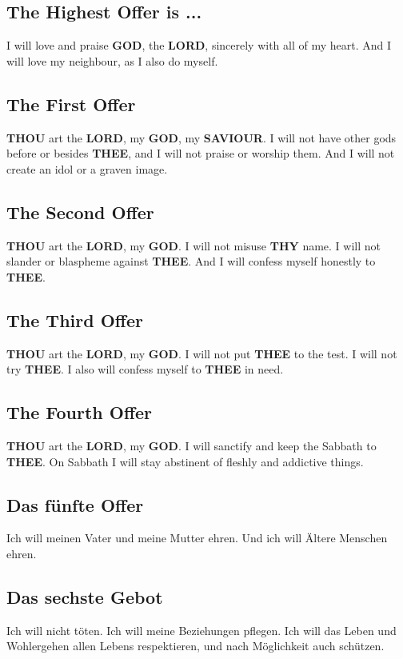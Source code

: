 \documentclass[12pt,a4paper]{article}
\newcommand{\God}[0]{\textbf{GOD}}
\newcommand{\Lord}[0]{\textbf{LORD}}
\newcommand{\Saviour}[0]{\textbf{SAVIOUR}}
\newcommand{\Thee}[0]{\textbf{THEE}}
\newcommand{\Thou}[0]{\textbf{THOU}}
\newcommand{\Thy}[0]{\textbf{THY}}
\begin{document}
	\subsection{The Highest Offer is ...}
		I will love and praise {\God},
		the {\Lord},
		sincerely with all of my heart.
		And I will love my neighbour,
		as I also do myself.
		
	\subsection{The First Offer}
		{\Thou} art the {\Lord},
		my {\God},
		my {\Saviour}.
		I will not have other gods before or besides {\Thee},
		and I will not praise or worship them.
		And I will not create an idol or a graven image.
		
	\subsection{The Second Offer}
		{\Thou} art the {\Lord},
		my {\God}.
		I will not misuse {\Thy} name.
		I will not slander or blaspheme against {\Thee}.
		And I will confess myself honestly to {\Thee}.
			
	\subsection{The Third Offer}
		{\Thou} art the {\Lord},
		my {\God}.
		I will not put {\Thee} to the test.
		I will not try {\Thee}.
		I also will confess myself to {\Thee} in need.
		
	\subsection{The Fourth Offer}
		{\Thou} art the {\Lord},
		my {\God}.
		I will sanctify and keep the Sabbath to {\Thee}.
		On Sabbath I will stay abstinent of fleshly
		and addictive things.
		
	\subsection{Das f\"unfte Offer}
		Ich will meinen Vater und meine Mutter ehren.
		Und ich will \"Altere Menschen ehren.
			
	\subsection{Das sechste Gebot}
		Ich will nicht t\"oten.
		Ich will meine Beziehungen pflegen.
		Ich will das Leben und Wohlergehen allen Lebens respektieren,
		und nach M\"oglichkeit auch sch\"utzen.
		
\end{document}
